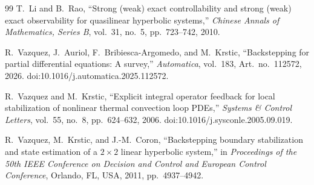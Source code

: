 \documentclass[12pt]{article}
\theoremstyle{plain}
\theoremstyle{remark}
\begin{document}
\begin{thebibliography}{99}
T.~Li and B.~Rao,
``Strong (weak) exact controllability and strong (weak) exact observability for quasilinear hyperbolic systems,''
\emph{Chinese Annals of Mathematics, Series B}, vol.~31, no.~5, pp.~723--742, 2010.

R.~Vazquez, J.~Auriol, F.~Bribiesca-Argomedo, and M.~Krstic,
``Backstepping for partial differential equations: A survey,''
\emph{Automatica}, vol.~183, Art.~no.~112572, 2026.
doi:10.1016/j.automatica.2025.112572.

R.~Vazquez and M.~Krstic,
``Explicit integral operator feedback for local stabilization of nonlinear thermal convection loop PDEs,''
\emph{Systems \& Control Letters}, vol.~55, no.~8, pp.~624--632, 2006.
doi:10.1016/j.sysconle.2005.09.019.

R.~Vazquez, M.~Krstic, and J.-M.~Coron,
``Backstepping boundary stabilization and state estimation of a $2\times2$ linear hyperbolic system,''
in \emph{Proceedings of the 50th IEEE Conference on Decision and Control and European Control Conference}, Orlando, FL, USA, 2011, pp.~4937--4942.

\end{thebibliography}
\end{document}
